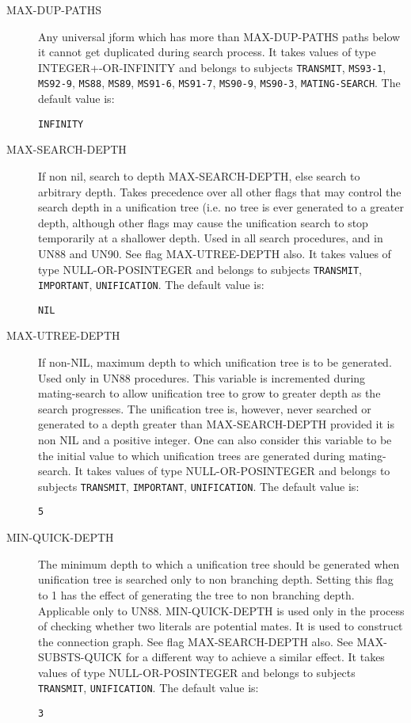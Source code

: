 \begin{description}
\item[MAX-DUP-PATHS]  
Any universal jform which has more than MAX-DUP-PATHS paths below it cannot get
duplicated during search process.
It takes values of type INTEGER+-OR-INFINITY and belongs to subjects \texttt{TRANSMIT}, \texttt{MS93-1}, \texttt{MS92-9}, \texttt{MS88}, \texttt{MS89}, \texttt{MS91-6}, \texttt{MS91-7}, \texttt{MS90-9}, \texttt{MS90-3}, \texttt{MATING-SEARCH}.  The default value is: \begin{lstlisting}
INFINITY
\end{lstlisting}

\item[MAX-SEARCH-DEPTH]  
If non nil, search to depth MAX-SEARCH-DEPTH, else search to
arbitrary depth. Takes precedence over all other flags that may 
control the search depth in a unification tree (i.e. no tree is ever
generated to a greater depth, although other flags may cause the 
unification search to stop temporarily at a shallower depth. Used 
in all search procedures, and in UN88 and UN90. 
See flag MAX-UTREE-DEPTH also.
It takes values of type NULL-OR-POSINTEGER and belongs to subjects \texttt{TRANSMIT}, \texttt{IMPORTANT}, \texttt{UNIFICATION}.  The default value is: \begin{lstlisting}
NIL
\end{lstlisting}

\item[MAX-UTREE-DEPTH]  
If non-NIL, maximum depth to which unification tree is to be 
generated. Used only in UN88 procedures. This variable is incremented 
during mating-search to allow unification tree to grow to 
greater depth as the search progresses. The unification tree
is, however, never searched or generated to a depth greater than
MAX-SEARCH-DEPTH provided it is non NIL and a positive integer. One can
also consider this variable to be the initial value to which unification
trees are generated during mating-search.
It takes values of type NULL-OR-POSINTEGER and belongs to subjects \texttt{TRANSMIT}, \texttt{IMPORTANT}, \texttt{UNIFICATION}.  The default value is: \begin{lstlisting}
5
\end{lstlisting}

\item[MIN-QUICK-DEPTH]  
The minimum depth to which a unification tree should be generated
when unification tree is searched only to non branching depth. Setting this
flag to 1 has the effect of generating the tree to non branching depth.
Applicable only to UN88.
MIN-QUICK-DEPTH is used only in the process of checking whether two
literals are potential mates. It is used to construct the connection graph.
See flag MAX-SEARCH-DEPTH also.
See MAX-SUBSTS-QUICK for a different way to achieve a similar effect.
It takes values of type NULL-OR-POSINTEGER and belongs to subjects \texttt{TRANSMIT}, \texttt{UNIFICATION}.  The default value is: \begin{lstlisting}
3
\end{lstlisting}


\end{description}
